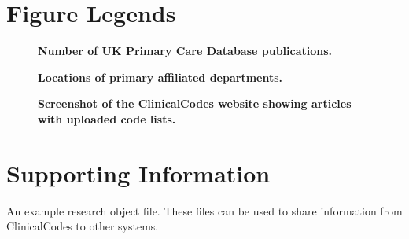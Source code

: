 \documentclass[10pt]{article}
\begin{document}
\section*{Figure Legends}

\begin{figure}[!ht]
\begin{center}
\end{center}
\caption{
    {\bf Number of UK Primary Care Database publications.}
}
\label{figure1_articles_per_year}
\end{figure}

\begin{figure}[!ht]
\begin{center}
\end{center}
\caption{
    {\bf Locations of primary affiliated departments.}
}
\label{figure2_PCD_map}
\end{figure}

\begin{figure}[!ht]
\begin{center}
\end{center}
\caption{
    {\bf Screenshot of the ClinicalCodes website showing articles with uploaded code lists.}
}
\label{figure3_screenshot}
\end{figure}

\section*{Supporting Information}

An example research object file. These files can be used to share information from ClinicalCodes to other systems.
\end{document}
